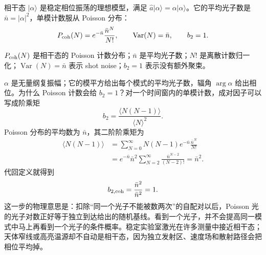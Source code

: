 相干态 \(|\alpha\rangle\) 是稳定相位振荡的理想模型，满足 \(\hat a|\alpha\rangle=\alpha|\alpha\rangle\)。它的平均光子数是 \(\bar n=|\alpha|^2\)，单模计数服从 Poisson 分布：
\begin{equation}
  P_{\rm coh}(N)=e^{-\bar n}\frac{\bar n^N}{N!},
  \qquad
  \operatorname{Var}(N)=\bar n,\qquad
  b_2=1.
  \label{eq:ch03-coherent}
\end{equation}
\begin{formulaexplain}
\(P_{\rm coh}(N)\) 是相干态的 Poisson 计数分布；\(\bar n\) 是平均光子数；\(N!\) 是离散计数归一化；\(\operatorname{Var}(N)=\bar n\) 表示 shot noise；\(b_2=1\) 表示没有额外聚束。
\end{formulaexplain}
\(\alpha\) 是无量纲复振幅；它的模平方给出每个模式的平均光子数，辐角 \(\arg\alpha\) 给出相位。为什么 Poisson 计数会给 \(b_2=1\)？对一个时间窗内的单模计数，成对因子可以写成阶乘矩
\[
  b_2
  =
  \frac{\langle N(N-1)\rangle}{\langle N\rangle^2}.
\]
Poisson 分布的平均数为 \(\bar n\)，其二阶阶乘矩为
\[
  \begin{aligned}
  \langle N(N-1)\rangle
  &=
  \sum_{N=0}^{\infty}N(N-1)e^{-\bar n}\frac{\bar n^N}{N!}  \\
  &=
  e^{-\bar n}\bar n^2
  \sum_{N=2}^{\infty}\frac{\bar n^{N-2}}{(N-2)!}
  =
  \bar n^2 .
  \end{aligned}
\]
代回定义就得到
\[
  b_{2,{\rm coh}}
  =
  \frac{\bar n^2}{\bar n^2}=1 .
\]
这一步的物理意思是：扣除“同一个光子不能被数两次”的自配对以后，Poisson 光的光子对数正好等于独立到达给出的随机基线。看到一个光子，并不会提高同一模式中马上再看到一个光子的条件概率。稳定实验室激光在许多测量中接近相干态；天体窄线或高亮温源却不自动是相干态，因为独立发射区、速度场和散射路径会把相位平均掉。

